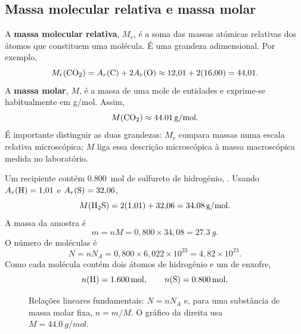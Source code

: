 \documentclass[11pt,a4paper,oneside]{book}
\begin{document}
\subsection*{Massa molecular relativa e massa molar}
A \textbf{massa molecular relativa}, $M_r$, é a soma das massas atómicas relativas dos átomos que constituem uma molécula. É uma grandeza adimensional. Por exemplo,
\[
M_r(\ce{CO2})=A_r(\ce C)+2A_r(\ce O)\approx12{,}01+2(16{,}00)=44{,}01.
\]
A \textbf{massa molar}, $M$, é a massa de uma mole de entidades e exprime-se habitualmente em \si{g/mol}. Assim,
\[
M(\ce{CO2})\approx\SI{44.01}{g/mol}.
\]
É importante distinguir as duas grandezas: $M_r$ compara massas numa escala relativa microscópica; $M$ liga essa descrição microscópica à massa macroscópica medida no laboratório.

\begin{exemplo}[title={Exemplo resolvido -- massa, quantidade de matéria e entidades}]
Um recipiente contém \SI{0.800}{mol} de sulfureto de hidrogénio, . Usando $A_r(\ce H)=1{,}01$ e $A_r(\ce S)=32{,}06$,
\[
M(\ce{H2S})=2(1{,}01)+32{,}06=\SI{34.08}{g/mol}.
\]
A massa da amostra é
\[
m=nM=0{,}800\times34{,}08=\SI{27.3}{g}.
\]
O número de moléculas é
\[
N=nN_A=0{,}800\times6{,}022\times10^{23}=4{,}82\times10^{23}.
\]
Como cada molécula contém dois átomos de hidrogénio e um de enxofre,
\[
n(\ce H)=\SI{1.600}{mol},\qquad n(\ce S)=\SI{0.800}{mol}.
\]
\end{exemplo}

\begin{figure}[H]
\centering
\begin{minipage}{.48\textwidth}
\centering
{}
\end{minipage}\hfill
\begin{minipage}{.48\textwidth}
\centering
{}
\end{minipage}
\caption{Relações lineares fundamentais: $N=nN_A$ e, para uma substância de massa molar fixa, $n=m/M$. O gráfico da direita usa $M=\SI{44.0}{g/mol}$.}
\end{figure}
\end{document}
